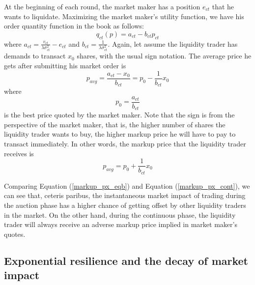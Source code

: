 \documentclass{article}
\begin{document}
At the beginning of each round, the market maker has a position $e_{ct}$ that he wants to liquidate. Maximizing the market maker's utility function, we have his order quantity function in the book as follows:
\[
q_{ct}(p) = a_{ct} - b_{ct} p_{ct}
\]
where $a_{ct} = \frac{v_{ct}}{\lambda \sigma_{ct}^2} - e_{ct}$ and $b_{ct}=\frac{1}{\lambda \sigma_{ct}^2}$. Again, let assume the liquidity trader has demands to transact $x_0$ shares, with the usual sign notation. The average price he gets after submitting his market order is 
\[
p_{avg} = \frac{a_{ct}-x_0}{b_{ct}}=p_0 - \frac{1}{b_{ct}} x_0
\]
where 
\[
p_0 = \frac{a_{ct}}{b_{ct}}
\] 
is the best price quoted by the market maker. Note that the sign is from the perspective of the market maker, that is, the higher number of shares the liquidity trader wants to buy, the higher markup price he will have to pay to transact immediately. In other words, the markup price that the liquidity trader receives is
\begin{equation}\label{markup_px_cont}
p_{avg} = p_0 + \frac{1}{b_{ct}} x_0
\end{equation}

Comparing Equation (\ref{markup_px_eqb}) and Equation (\ref{markup_px_cont}), we can see that, ceteris paribus, the instantaneous market impact of trading during the auction phase has a higher chance of getting offset by other liquidity traders in the market. On the other hand, during the continuous phase, the liquidity trader will always receive an adverse markup price implied in market maker's quotes.

\subsection{Exponential resilience and the decay of market impact}
\end{document}
